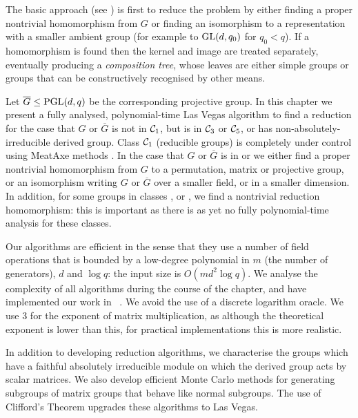 The basic approach (see \cite{MatGrpProj, AkosMaxISSAC}) 
is first to reduce 
the problem by either finding a proper nontrivial homomorphism 
from $G$ or finding an isomorphism to a representation 
with a smaller ambient group (for example to $\GL(d, q_0)$ 
for  $q_0 < q$).  
If a homomorphism is found then the kernel and image are treated
separately, eventually producing a
\emph{composition tree}, whose leaves are either simple groups or
groups that can be constructively  recognised by other means.
%

Let 
$\overline{G} \leq \PGL(d, q)$ be the corresponding projective group. 
In this chapter we present a fully analysed, polynomial-time Las
Vegas algorithm to find a reduction for the case that  $G$ or $\overline{G}$
 is not in $\mathcal{C}_{1}$, but is in $\mathcal{C}_{3}$ or $\mathcal{C}_{5}$, 
or has non-absolutely-irreducible derived group. 
Class $\mathcal{C}_{1}$ (reducible groups)
 is completely under control using MeatAxe methods
\cite{MeatAxeHoltRees, IL, MeatAxeRP}.
In the case that $G$ or $\overline{G}$ is in  or  
we either find a proper nontrivial homomorphism from $G$ to a permutation, matrix or projective group, or an isomorphism writing $G$ or $\overline{G}$ over a smaller field, or in a smaller dimension. 
  In addition, for some groups in classes ,  or ,
 we find a nontrivial reduction homomorphism: 
this is important as there is as yet no fully 
polynomial-time analysis for these classes. 

Our algorithms are efficient in the sense that they use a 
number of field operations that is bounded by a low-degree polynomial 
in $m$ (the number of generators), $d$ and $\log q$: 
the input size is  $O(m d^2 \log q)$. We analyse 
the complexity of all algorithms during the course 
of the chapter, and have implemented our work in \GAP\ \cite{GAP4}. 
We avoid the use of a discrete logarithm oracle. We use $3$ for
 the exponent of matrix multiplication, as although the theoretical 
exponent is lower than this, for practical implementations this is 
more realistic. 

In addition to developing reduction algorithms, we characterise 
the groups which have a faithful absolutely irreducible module
on which the derived group acts by scalar matrices. 
We also develop efficient Monte Carlo 
methods for generating subgroups of matrix groups that behave 
like normal subgroups. The use of Clifford's Theorem 
upgrades these algorithms to Las Vegas. 

